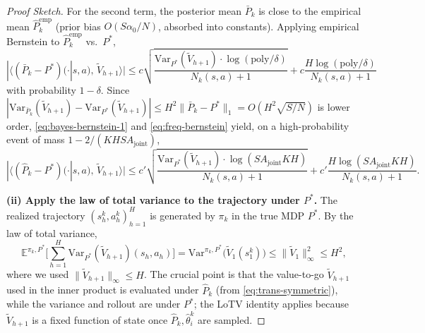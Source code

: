 \begin{proof}[Proof Sketch]
For the second term, the posterior mean $\bar{P}_k$ is close to the empirical mean $\hat{P}^{\mathrm{emp}}_k$ (prior bias $O(S\alpha_0/N)$, absorbed into constants). Applying empirical Bernstein \citep[Lemma 3]{azar2017minimax} to $\hat{P}^{\mathrm{emp}}_k$ vs.\ $P^*$,
\begin{equation}
\label{eq:freq-bernstein}
|\langle (\bar{P}_k - P^*)(\cdot|s,a),\, \widetilde{V}_{h+1}\rangle| \leq c\sqrt{\frac{\mathrm{Var}_{P^*}(\widetilde{V}_{h+1}) \cdot \log(\mathrm{poly}/\delta)}{N_k(s, a) + 1}} + c\frac{H \log(\mathrm{poly}/\delta)}{N_k(s, a) + 1}
\end{equation}
with probability $1 - \delta$. Since $|\mathrm{Var}_{\bar{P}_k}(\widetilde{V}_{h+1}) - \mathrm{Var}_{P^*}(\widetilde{V}_{h+1})| \leq H^2 \|\bar{P}_k - P^*\|_1 = O(H^2 \sqrt{S/N})$ is lower order, \eqref{eq:bayes-bernstein-1} and \eqref{eq:freq-bernstein} yield, on a high-probability event of mass $1 - 2/(KHSA_{\mathrm{joint}})$,
\begin{equation}
\label{eq:bernstein-combined}
|\langle (\hat{P}_k - P^*)(\cdot|s,a),\, \widetilde{V}_{h+1}\rangle| \leq c'\sqrt{\frac{\mathrm{Var}_{P^*}(\widetilde{V}_{h+1}) \cdot \log(SA_{\mathrm{joint}}KH)}{N_k(s, a) + 1}} + c'\frac{H \log(SA_{\mathrm{joint}}KH)}{N_k(s, a) + 1}.
\end{equation}

\textbf{(ii) Apply the law of total variance to the trajectory under $P^*$.} The realized trajectory $(s_h^k, a_h^k)_{h=1}^H$ is generated by $\pi_k$ in the true MDP $P^*$. By the law of total variance,
\begin{equation}
\mathbb{E}^{\pi_k, P^*}\bigg[\sum_{h=1}^H \mathrm{Var}_{P^*}(\widetilde{V}_{h+1})(s_h, a_h)\bigg] = \mathrm{Var}^{\pi_k, P^*}\bigg(\widetilde{V}_{1}(s_1^k)\bigg) \leq \|\widetilde{V}_1\|_\infty^2 \leq H^2,
\end{equation}
where we used $\|\widetilde{V}_{h+1}\|_\infty \leq H$. The crucial point is that the value-to-go $\widetilde{V}_{h+1}$ used in the inner product is evaluated under $\hat{P}_k$ (from \eqref{eq:trans-symmetric}), while the variance and rollout are under $P^*$; the LoTV identity applies because $\widetilde{V}_{h+1}$ is a fixed function of state once $\hat{P}_k, \hat{\theta}_i^k$ are sampled.


\end{proof}
